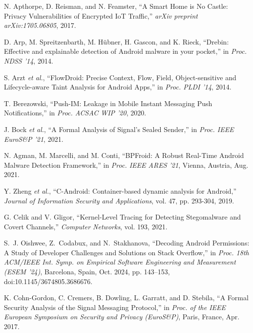 \documentclass[a4paper,12pt]{report}
\begin{document}
\begin{thebibliography}{99}

N. Apthorpe, D. Reisman, and N. Feamster, “A Smart Home is No Castle: Privacy Vulnerabilities of Encrypted IoT Traffic,” \emph{arXiv preprint arXiv:1705.06805}, 2017.

D. Arp, M. Spreitzenbarth, M. Hübner, H. Gascon, and K. Rieck, “Drebin: Effective and explainable detection of Android malware in your pocket,” in \emph{Proc. NDSS '14}, 2014.

S. Arzt \emph{et al.}, “FlowDroid: Precise Context, Flow, Field, Object-sensitive and Lifecycle-aware Taint Analysis for Android Apps,” in \emph{Proc. PLDI '14}, 2014.

T. Berezowski, “Push-IM: Leakage in Mobile Instant Messaging Push Notifications,” in \emph{Proc. ACSAC WIP '20}, 2020.

J. Bock \emph{et al.}, “A Formal Analysis of Signal's Sealed Sender,” in \emph{Proc. IEEE EuroS\&P '21}, 2021.

N. Agman, M. Marcelli, and M. Conti, “BPFroid: A Robust Real-Time Android Malware Detection Framework,” in \emph{Proc. IEEE ARES ’21}, Vienna, Austria, Aug. 2021.

Y. Zheng \emph{et al.}, “C-Android: Container-based dynamic analysis for Android,” \emph{Journal of Information Security and Applications}, vol. 47, pp. 293-304, 2019.

G. Celik and V. Gligor, “Kernel-Level Tracing for Detecting Stegomalware and Covert Channels,” \emph{Computer Networks}, vol. 193, 2021.

S.~J. Oishwee, Z.~Codabux, and N.~Stakhanova, “Decoding Android Permissions: A Study of Developer Challenges and Solutions on Stack Overflow,” in \emph{Proc. 18th ACM/IEEE Int. Symp. on Empirical Software Engineering and Measurement (ESEM ’24)}, Barcelona, Spain, Oct. 2024, pp. 143–153, doi:10.1145/3674805.3686676.

K. Cohn-Gordon, C. Cremers, B. Dowling, L. Garratt, and D. Stebila, “A Formal Security Analysis of the Signal Messaging Protocol,” in \emph{Proc. of the IEEE European Symposium on Security and Privacy (EuroS\&P)}, Paris, France, Apr. 2017.


\end{thebibliography}
\end{document}
